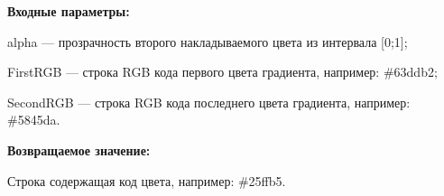 \textbf{Входные параметры:}

alpha --- прозрачность второго накладываемого цвета из интервала [0;1];
 
    FirstRGB --- строка RGB кода первого цвета градиента, например: \#63ddb2;
 
    SecondRGB --- строка RGB кода последнего цвета градиента, например: \#5845da.

\textbf{Возвращаемое значение:}

Строка содержащая код цвета, например: \#25ffb5.